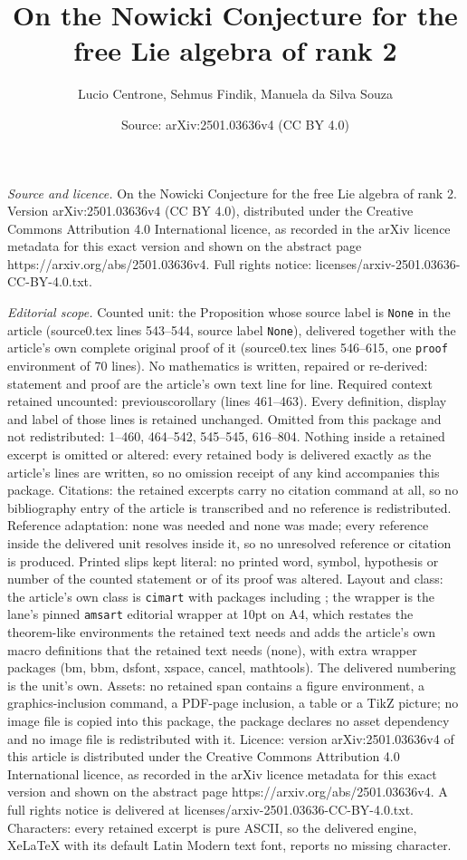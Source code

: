 \documentclass[10pt,a4paper]{amsart}
\title[On the Nowicki Conjecture for the free Lie algebra of rank 2]{On the Nowicki Conjecture for the free Lie algebra of rank 2}
\author{Lucio Centrone, Sehmus Findik, Manuela da Silva Souza}
\date{Source: arXiv:2501.03636v4 (CC BY 4.0)}
\begin{document}
\maketitle

\noindent\emph{Source and licence.} On the Nowicki Conjecture for the free Lie algebra of rank 2. Version arXiv:2501.03636v4 (CC BY 4.0), distributed under the Creative Commons Attribution 4.0 International licence, as recorded in the arXiv licence metadata for this exact version and shown on the abstract page https://arxiv.org/abs/2501.03636v4. Full rights notice: licenses/arxiv-2501.03636-CC-BY-4.0.txt.\par\smallskip

\noindent\textit{Editorial scope.} Counted unit: the Proposition whose source label is \texttt{None} in the article (source0.tex lines 543--544, source label \texttt{None}), delivered together with the article's own complete original proof of it (source0.tex lines 546--615, one \texttt{proof} environment of 70 lines). No mathematics is written, repaired or re-derived: statement and proof are the article's own text line for line. Required context retained uncounted: previouscorollary (lines 461--463). Every definition, display and label of those lines is retained unchanged. Omitted from this package and not redistributed: 1--460, 464--542, 545--545, 616--804. Nothing inside a retained excerpt is omitted or altered: every retained body is delivered exactly as the article's lines are written, so no omission receipt of any kind accompanies this package. Citations: the retained excerpts carry no citation command at all, so no bibliography entry of the article is transcribed and no reference is redistributed. Reference adaptation: none was needed and none was made; every reference inside the delivered unit resolves inside it, so no unresolved reference or citation is produced. Printed slips kept literal: no printed word, symbol, hypothesis or number of the counted statement or of its proof was altered. Layout and class: the article's own class is \texttt{cimart} with packages including ; the wrapper is the lane's pinned \texttt{amsart} editorial wrapper at 10pt on A4, which restates the theorem-like environments the retained text needs and adds the article's own macro definitions that the retained text needs (none), with extra wrapper packages (bm, bbm, dsfont, xspace, cancel, mathtools). The delivered numbering is the unit's own. Assets: no retained span contains a figure environment, a graphics-inclusion command, a PDF-page inclusion, a table or a TikZ picture; no image file is copied into this package, the package declares no asset dependency and no image file is redistributed with it. Licence: version arXiv:2501.03636v4 of this article is distributed under the Creative Commons Attribution 4.0 International licence, as recorded in the arXiv licence metadata for this exact version and shown on the abstract page https://arxiv.org/abs/2501.03636v4. A full rights notice is delivered at licenses/arxiv-2501.03636-CC-BY-4.0.txt. Characters: every retained excerpt is pure ASCII, so the delivered engine, XeLaTeX with its default Latin Modern text font, reports no missing character.
\end{document}
